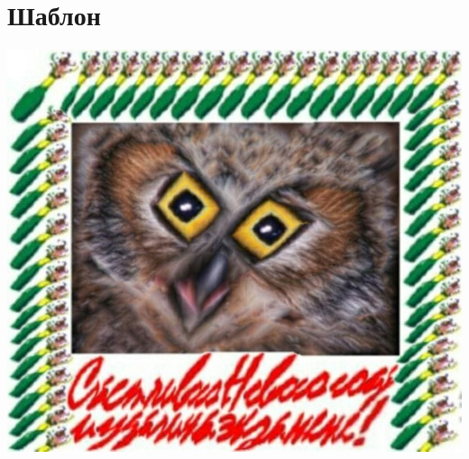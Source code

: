 \documentclass[../main.tex]{subfiles}
\begin{document}
\section{Шаблон}

\includegraphics[scale=0.7]{example.jpg} 
\end{document}
